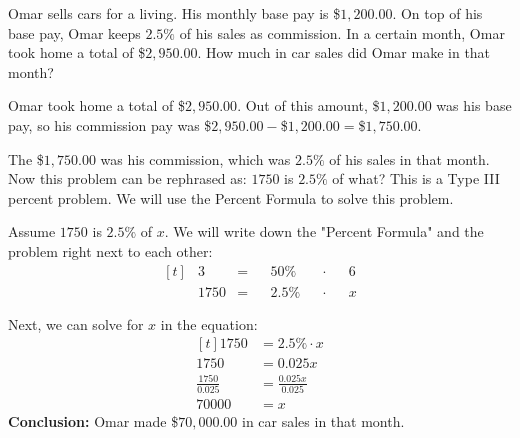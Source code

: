 \begin{myexample}
Omar sells cars for a living. His monthly base pay is \$$1,200.00$. On top of his base pay, Omar keeps $2.5\%$ of his sales as commission. In a certain month, Omar took home a total of \$$2,950.00$. How much in car sales did Omar make in that month?
\end{myexample}
\begin{solution}
Omar took home a total of \$$2,950.00$. Out of this amount, \$$1,200.00$ was his base pay, so his commission pay was \$$2,950.00-$\$$1,200.00=$\$$1,750.00$.

The \$$1,750.00$ was his commission, which was $2.5\%$ of his sales in that month. Now this problem can be rephrased as: $1750$ is $2.5\%$ of what? This is a Type III percent problem. We will use the Percent Formula to solve this problem.

Assume $1750$ is $2.5\%$ of $x$. We will write down the "Percent Formula" and the problem right next to each other:
\[
\begin{aligned}[t]
	&3 &= &&50\% &&\cdot &&6 \\
	&1750 &= &&2.5\% &&\cdot &&x
\end{aligned}
\]

Next, we can solve for $x$ in the equation:
\[
\begin{aligned}[t]
	1750 &= 2.5\% \cdot x \\
	1750 &= 0.025x \\
	\frac{1750}{0.025} &= \frac{0.025x}{0.025} \\
	70000 &= x
\end{aligned}
\]
\textbf{Conclusion:} Omar made \$$70,000.00$ in car sales in that month.

\end{solution}


